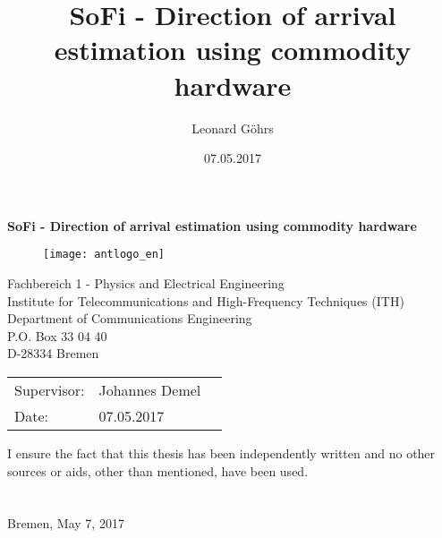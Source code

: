 \thispagestyle{empty}
\title{SoFi - Direction of arrival estimation using commodity hardware}
\author{Leonard Göhrs}
\date{07.05.2017}

\begin{titlepage}
  \noindent

  \vspace{55 mm}

  \begin{center}
    \begin{huge}
      \textbf{SoFi - Direction of arrival estimation using commodity hardware}
    \end{huge}
  \end{center}

  \vspace{55 mm}

  \begin{figure}[H]
    \centering
    \texttt{[image: antlogo\_en]}
    \\
    \label{img:FrontPage}
  \end{figure}

  \begin{center}
    Fachbereich 1 - Physics and Electrical Engineering \\
    Institute for Telecommunications and High-Frequency Techniques (ITH) \\
    Department of Communications Engineering \\
    P.O. Box 33 04 40 \\
    D-28334 Bremen \\
  \end{center}

  \vfill

  \begin{center}
    \begin{tabular}{lll}
      Supervisor: & Johannes Demel \\
      Date: & 07.05.2017
    \end{tabular}
  \end{center}

  \vspace{5mm}
  \noindent I ensure the fact that this thesis has been independently written and no other
  sources or aids, other than mentioned, have been used. \\ \\ \\
  Bremen, May 7, 2017 \hspace{5mm} \hrulefill

  \newpage
\end{titlepage}
